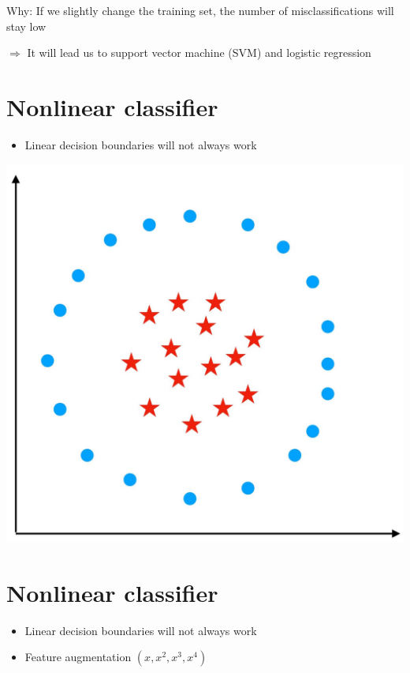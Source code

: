 \documentclass[10pt]{article}
\begin{document}
Why: If we slightly change the training set, the number of misclassifications will stay low

$\Rightarrow$ It will lead us to support vector machine (SVM) and logistic regression

\section*{Nonlinear classifier}
\begin{itemize}
  \item Linear decision boundaries will not always work
\end{itemize}

\begin{center}
\includegraphics[max width=\textwidth]{2023_12_30_cf784c471dfd1dd5afbag-24}
\end{center}

\section*{Nonlinear classifier}
\begin{itemize}
  \item Linear decision boundaries will not always work

  \item Feature augmentation $\left(x, x^{2}, x^{3}, x^{4}\right)$

\end{itemize}
\end{document}
